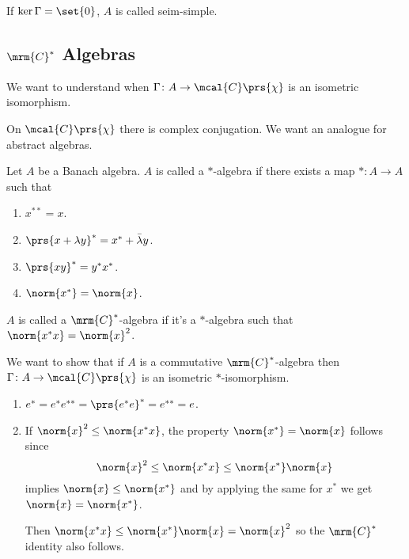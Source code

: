 \documentclass[10pt, twoside]{book}
\begin{document}
\begin{definition}
If $\ker \Gamma = \set{0}$, $A$ is called seim-simple.
\end{definition}

\subsection{$\mrm{C}^*$ Algebras}

We want to understand when $\Gamma \colon A \to \mcal{C}\prs{\chi}$ is an isometric isomorphism.

On $\mcal{C}\prs{\chi}$ there is complex conjugation. We want an analogue for abstract algebras.

\begin{definition}[$*$-Algebra]
Let $A$ be a Banach algebra. $A$ is called a $*$-algebra if there exists a map $* \colon A \to A$ such that
\begin{enumerate}
\item $x^{**} = x$.
\item $\prs{x+\lambda y}^* = x^* + \bar{\lambda} y$.
\item $\prs{xy}^* = y^* x^*$.
\item $\norm{x^*} = \norm{x}$.
\end{enumerate}
\end{definition}

\begin{definition}
$A$ is called a $\mrm{C}^*$-algebra if it's a $*$-algebra such that $\norm{x^* x} = \norm{x}^2$.
\end{definition}

We want to show that if $A$ is a commutative $\mrm{C}^*$-algebra then $\Gamma \colon A \to \mcal{C}\prs{\chi}$ is an isometric $*$-isomorphism.

\begin{remark}
\begin{enumerate}
\item $e^* = e^* e^{**} = \prs{e^* e}^* = e^{**} = e$.
\item If $\norm{x}^2 \leq \norm{x^* x}$, the property $\norm{x^*} = \norm{x}$ follows
since
\[\norm{x}^2 \leq \norm{x^* x} \leq \norm{x^*} \norm{x}\]
implies $\norm{x} \leq \norm{x^*}$ and by applying the same for $x^*$ we get $\norm{x} = \norm{x^*}$.

Then $\norm{x^* x} \leq \norm{x^*} \norm{x} = \norm{x}^2$ so the $\mrm{C}^*$ identity also follows. 
\end{enumerate}
\end{remark}
\end{document}
